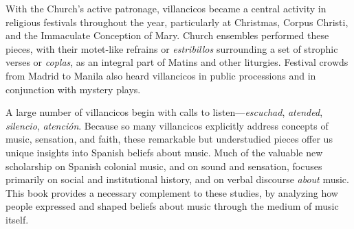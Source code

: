 With the Church's active patronage, villancicos became a central activity in
religious festivals throughout the year, particularly at Christmas, Corpus
Christi, and the Immaculate Conception of Mary. Church ensembles performed these
pieces, with their motet-like refrains or \emph{estribillos} surrounding a set of
strophic verses or \emph{coplas}, as an integral part of Matins and other liturgies.
Festival crowds from Madrid to Manila also heard villancicos in public
processions and in conjunction with mystery plays. 

A large number of villancicos begin with calls to listen---\emph{escuchad},
\emph{atended}, \emph{silencio}, \emph{atención}. 
Because so many villancicos explicitly address concepts of music, sensation, and
faith, these remarkable but understudied pieces offer us unique insights into
Spanish beliefs about music.
Much of the valuable new scholarship on Spanish colonial music, and on sound and
sensation, focuses primarily on social and institutional history, and on verbal
discourse \emph{about} music.%
    \Autocites{Baker:Harmony}{BakerKnighton:MusicUrbanSociety}{Irving:Colonial} 
    {RamosKittrell:PlayingCathedral}{DellAntonio:Listening}
This book provides a necessary complement to these studies, by analyzing how
people expressed and shaped beliefs about music through the medium of music
itself.

%
%


\endinput
